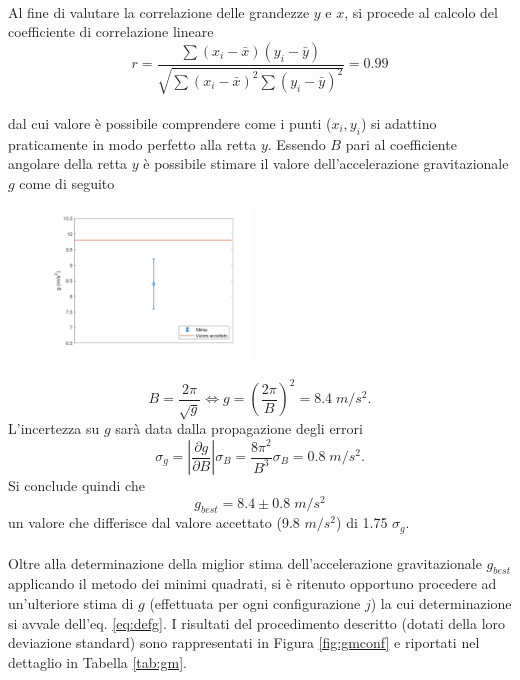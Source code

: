 \documentclass[11pt,a4paper]{article}
\begin{document}
\\
Al fine di valutare la correlazione delle grandezze $y$ e $x$, si procede al calcolo del coefficiente di correlazione lineare
\\
\begin{equation}
    r = \frac{\sum (x_i - \bar{x})(y_i - \bar{y})}{\sqrt{\sum (x_i - \bar{x})^2 \sum (y_i - \bar{y})^2}} = 0.99
\end{equation}
\\
dal cui valore è possibile comprendere come i punti ($x_i,y_i$) si adattino praticamente in modo perfetto alla retta $y$. Essendo $B$ pari al coefficiente angolare della retta $y$ è possibile stimare il valore dell'accelerazione gravitazionale $g$ come di seguito
\begin{figure}
  \begin{center}
    \includegraphics[width=0.48\textwidth]{img/gplot1.png}
  \end{center}
  \label{fig:gbest}
\end{figure}
\begin{equation}
    B = \frac{2 \pi}{\sqrt{g}} \Longleftrightarrow g = \left( \frac{2 \pi}{B} \right )^2 = 8.4 \; m/s^2.
\end{equation}
L'incertezza su $g$ sarà data dalla propagazione degli errori
\begin{equation}
    \sigma_g = \left | \frac{\partial g}{\partial B} \right | \sigma_B = \frac{8 \pi^2}{B^3} \sigma_B = 0.8 \; m/s^2.
\end{equation}
Si conclude quindi che 
\begin{equation}
    g_{best} = 8.4 \pm 0.8 \; m/s^2
\end{equation}
un valore che differisce dal valore accettato (9.8 $m/s^2$) di 1.75 $\sigma_g$.
\\
\\
Oltre alla determinazione della miglior stima dell'accelerazione gravitazionale $g_{best}$ applicando il metodo dei minimi quadrati, si è ritenuto opportuno procedere ad un'ulteriore stima di $g$ (effettuata per ogni configurazione $j$) la cui determinazione si avvale dell'eq. \ref{eq:defg}. I risultati del procedimento descritto (dotati della loro deviazione standard) sono rappresentati in Figura \ref{fig:gmconf} e riportati nel dettaglio in Tabella \ref{tab:gm}.
\end{document}
